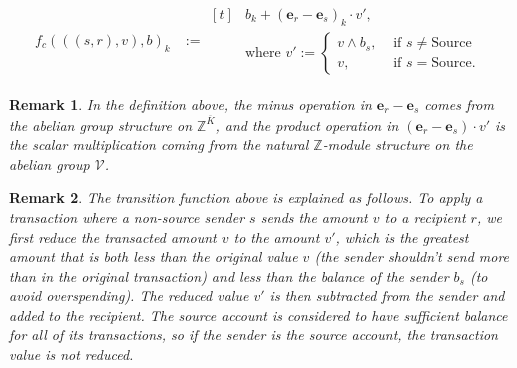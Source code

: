 \documentclass[runningheads]{llncs}
\newtheorem{rmk}{Remark}
\newcommand{\source}{\text{Source}}
\newcommand{\V}{\mathcal{V}}
\newcommand{\Z}{\mathbb{Z}}
\begin{document}
\begin{align*}
	f_c(((s,r),v),b)_k & :=
	\begin{aligned}[t]
		 & b_k + (\mathbf{e}_r - \mathbf{e}_s)_k \cdot v', \\
		 & \text{where } v' :=
		\begin{cases}
			v \wedge b_s, & \text{ if \(s \neq \source\)} \\
			v,            & \text{ if \(s = \source\)}.
		\end{cases}
	\end{aligned}
\end{align*}

\begin{rmk}
	In the definition above, the minus operation in \(\mathbf{e}_r - \mathbf{e}_s\) comes from the abelian group structure on \(\Z^{\overline{K}}\), and the product operation in \((\mathbf{e}_r - \mathbf{e}_s) \cdot v'\) is the scalar multiplication coming from the natural \(\Z\)-module structure on the abelian group \(\V\).
\end{rmk}

\begin{rmk}
	The transition function above is explained as follows. To apply a transaction where a non-source sender \(s\) sends the amount \(v\) to a recipient \(r\), we first reduce the transacted amount \(v\) to the amount \(v'\), which is the greatest amount that is both less than the original value \(v\) (the sender shouldn't send more than in the original transaction) and less than the balance of the sender \(b_s\) (to avoid overspending). The reduced value \(v'\) is then subtracted from the sender and added to the recipient. The source account is considered to have sufficient balance for all of its transactions, so if the sender is the source account, the transaction value is not reduced.
\end{rmk}
\end{document}
